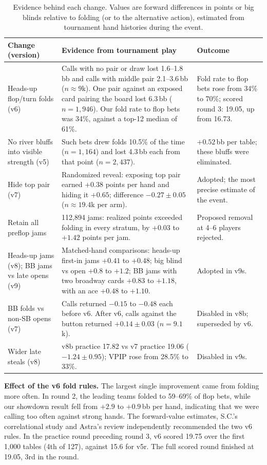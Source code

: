 \documentclass[10pt]{article}
\begin{document}
\begin{table}[!htb]
\centering\small
\begin{tabularx}{\textwidth}{L{0.2\textwidth} Y L{0.25\textwidth}}
\toprule
Change (version) & Evidence from tournament play & Outcome\\
\midrule
Heads-up flop/turn folds (v6) &
Calls with no pair or draw lost 1.6--1.8\,bb and calls with middle pair 2.1--3.6\,bb ($n\approx9$k). One pair against an exposed card pairing the board lost 6.3\,bb ($n=1{,}946$). Our fold rate to flop bets was 34\%, against a top-12 median of 61\%. &
Fold rate to flop bets rose from 34\% to 70\%; scored round 3: 19.05, up from 16.73.\\
No river bluffs into visible strength (v5) &
Such bets drew folds 10.5\% of the time ($n=1{,}164$) and lost 4.3\,bb each from that point ($n=2{,}437$). &
$+0.52$\,bb per table; these bluffs were eliminated.\\
Hide top pair (v7) &
Randomized reveal: exposing top pair earned $+0.38$ points per hand and hiding it $+0.65$; difference $-0.27\pm0.05$ ($n\approx19.4$k per arm). &
Adopted; the most precise estimate of the event.\\
Retain all preflop jams &
112,894 jams: realized points exceeded folding in every stratum, by $+0.03$ to $+1.42$ points per jam. &
Proposed removal at 4--6 players rejected.\\
Heads-up jams (v8); BB jams vs late opens (v9) &
Matched-hand comparisons: heads-up first-in jams $+0.41$ to $+0.48$; big blind vs open $+0.8$ to $+1.2$; BB jams with two broadway cards $+0.83$ to $+1.18$, with an ace $+0.48$ to $+1.10$. &
Adopted in v9s.\\
BB folds vs non-SB opens (v7) &
Calls returned $-0.15$ to $-0.48$ each before v6. After v6, calls against the button returned $+0.14\pm0.03$ ($n=9.1$k). &
Disabled in v8b; superseded by v6.\\
Wider late steals (v8) &
v8b practice 17.82 vs v7 practice 19.06 ($-1.24\pm0.95$); VPIP rose from 28.5\% to 33\%. &
Disabled in v9s.\\
\bottomrule
\end{tabularx}
\caption{Evidence behind each change. Values are forward differences in points or big blinds relative to folding (or to the alternative action), estimated from tournament hand histories during the event.}\label{tab:evidence}
\end{table}

\textbf{Effect of the v6 fold rules.} The largest single improvement came from folding more often. In round 2, the leading teams folded to 59--69\% of flop bets, while our showdown result fell from $+2.9$ to $+0.9$\,bb per hand, indicating that we were calling too often against strong hands. The forward-value estimates, S.C.'s correlational study and Astra's review independently recommended the two v6 rules. In the practice round preceding round 3, v6 scored 19.75 over the first 1,000 tables (4th of 127), against 15.6 for v5r. The full scored round finished at 19.05, 3rd in the round.
\end{document}
